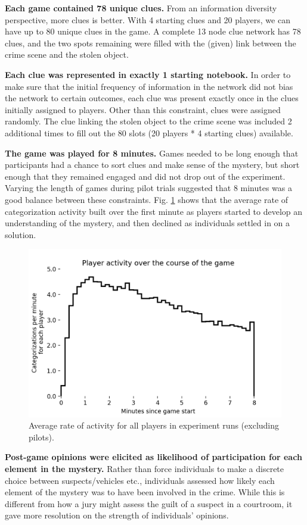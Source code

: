 \documentclass{article}
\begin{document}
\textbf{Each game contained 78 unique clues.}
From an information diversity perspective, more clues is better. With 4 starting clues and 20 players, we can have up to 80 unique clues in the game. A complete 13 node clue network has 78 clues, and the two spots remaining were filled with the (given) link between the crime scene and the stolen object. 

\textbf{Each clue was represented in exactly 1 starting notebook.}
In order to make sure that the initial frequency of information in the network did not bias the network to certain outcomes, each clue was present exactly once in the clues initially assigned to players. Other than this constraint, clues were assigned randomly. The clue linking the stolen object to the crime scene was included 2 additional times to fill out the 80 slots (20 players * 4 starting clues) available.

\textbf{The game was played for 8 minutes.} 
Games needed to be long enough that participants had a chance to sort clues and make sense of the mystery, but short enough that they remained engaged and did not drop out of the experiment. Varying the length of games during pilot trials suggested that 8 minutes was a good balance between these constraints. Fig. \ref{fig:player_activity} shows that the average rate of categorization activity built over the first minute as players started to develop an understanding of the mystery, and then declined as individuals settled in on a solution.

\begin{figure}[h!]
\centering
\includegraphics[width=.5\columnwidth]{player_activity.png}
\caption{Average rate of activity for all players in experiment runs (excluding pilots).}
\label{fig:player_activity}
\end{figure}

\textbf{Post-game opinions were elicited as likelihood of participation for each element in the mystery.}
Rather than force individuals to make a discrete choice between suspects/vehicles etc., individuals assessed how likely each element of the mystery was to have been involved in the crime. While this is different from how a jury might assess the guilt of a suspect in a courtroom, it gave more resolution on the strength of individuals' opinions. 
\end{document}

